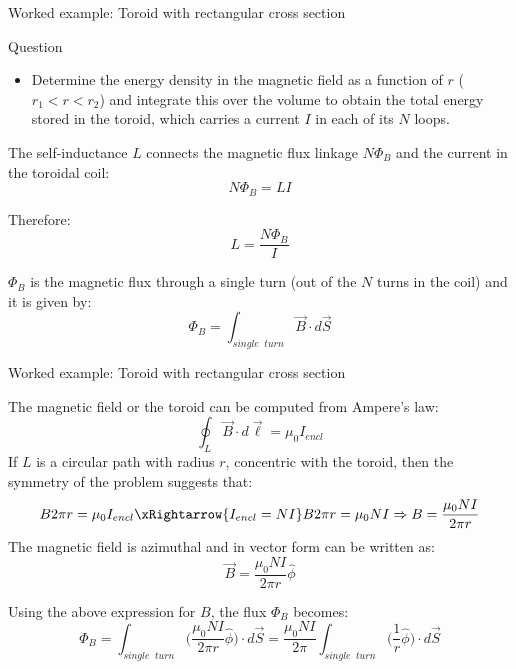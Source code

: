 {\begin{frame}{Worked example: Toroid with rectangular cross section}
  \begin{blockexmplque}{Question}
    \begin{itemize}
      \item
      Determine the energy density in the magnetic field as a function of $r$
      ($r_1 < r < r_2$) and integrate this over the volume to obtain the total
      energy stored in the toroid, which carries a current $I$ in each
      of its $N$ loops.
    \end{itemize}
  \end{blockexmplque}

  The self-inductance $L$ connects the magnetic flux linkage $N\Phi_B$
  and the current in the toroidal coil:
  \begin{equation*}
    N\Phi_B = L I
  \end{equation*}

  Therefore:
  \begin{equation*}
    L = \frac{N\Phi_B}{I}
  \end{equation*}

  $\Phi_B$ is the magnetic flux through a single turn (out of the $N$ turns
  in the coil) and it is given by:
  \begin{equation*}
    \Phi_B = \int_{single\;\;turn}\vec{B} \cdot d\vec{S}
  \end{equation*}

\end{frame}

%
%
%

\begin{frame}{Worked example: Toroid with rectangular cross section}

  The magnetic field or the toroid can be computed from Ampere's law:
  \begin{equation*}
    \oint_{L} \vec{B} \cdot d\vec{\ell} = \mu_0 I_{encl}
  \end{equation*}
  If $L$ is a circular path with radius $r$, concentric with the toroid,
  then the symmetry of the problem suggests that:
  \begin{equation*}
    B 2\pi r = \mu_0 I_{encl} \xRightarrow{I_{encl} = NI}
    B 2\pi r = \mu_0 NI \Rightarrow
    B = \frac{\mu_0 NI}{2\pi r}
  \end{equation*}
  The magnetic field is azimuthal and in vector form can be written as:
  \begin{equation*}
    \vec{B} = \frac{\mu_0 NI}{2\pi r} \hat{\phi}
  \end{equation*}

  Using the above expression for $B$, the flux $\Phi_B$ becomes:
  \begin{equation*}
    \Phi_B = \int_{single\;\;turn} \Big( \frac{\mu_0 NI}{2\pi r} \hat{\phi} \Big) \cdot d\vec{S}
           = \frac{\mu_0 NI}{2\pi} \int_{single\;\;turn} \Big( \frac{1}{r} \hat{\phi} \Big) \cdot d\vec{S}
  \end{equation*}


\end{frame}}
